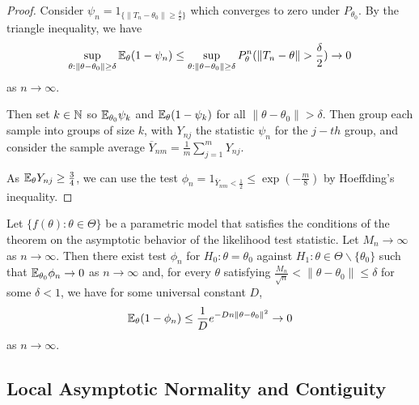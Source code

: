 \begin{proof}
  Consider $\psi_{n} = 1_{\{ \| T_{n} - \theta_{0} \| \geq
    \frac{\delta}{2} \} }$ which converges to zero under
  $P_{\theta_{0}}$.  By the triangle inequality, we have
  \begin{align}
    \label{eq:62}
    \sup_{\theta : \| \theta - \theta_{0} \| \geq \delta}
    \E_{\theta}(1 - \psi_{n}) \leq \sup_{\theta: \| \theta -
      \theta_{0} \| \geq \delta} P^{n}_{\theta}(\| T_{n} - \theta \| >
    \frac{\delta}{2}) \rightarrow 0
  \end{align} as $n \rightarrow \infty$.

  Then set $k \in \mathbb{N}$ so $\E_{\theta_{0}} \psi_{k}$ and $\E_{\theta}(1
  - \psi_{k})$ for all $\| \theta - \theta_{0} \| > \delta$.  Then
  group each sample into groups of size $k$, with $Y_{nj}$ the
  statistic $\psi_{n}$ for the $j-th$ group, and consider the sample
  average $\overline Y_{nm} = \frac{1}{m} \sum_{j=1}^{m} Y_{nj}$.

  As $\E_{\theta} Y_{nj} \geq \frac{3}{4}$, we can use the test
  $\phi_{n} = 1_{\overline Y_{nm} < \frac{1}{2}} \leq \exp(-\frac{m}{8})$ by Hoeffding's inequality.
\end{proof}

\begin{thm}
  Let $\{ f(\theta) : \theta \in \Theta \} $ be a parametric model
  that satisfies the conditions of the theorem on the asymptotic
  behavior of the likelihood test statistic. Let $M_{n} \rightarrow
  \infty$ as $n \rightarrow \infty$.  Then there exist test $\phi_{n}$
  for $H_{0}: \theta = \theta_{0}$ against $H_{1}: \theta \in \Theta
  \backslash \{ \theta_{0} \} $ such that $\E_{\theta_{0}} \phi_{n}
  \rightarrow 0$ as $n \rightarrow \infty$ and, for every $\theta$
  satisfying $\frac{M_{n}}{\sqrt{n}} < \| \theta - \theta_{0} \| \leq
  \delta$ for some $\delta < 1$, we have for some universal constant
  $D$,
  \begin{equation}
    \label{eq:27}
    \E_{\theta}(1 - \phi_{n}) \leq \frac{1}{D} e^{-Dn \| \theta -
      \theta_{0} \|^{2}} \rightarrow 0
  \end{equation} as $n \rightarrow \infty$.
\end{thm}
\subsection{Local Asymptotic Normality and Contiguity}
\label{sec:loccal-asympt-norm}


